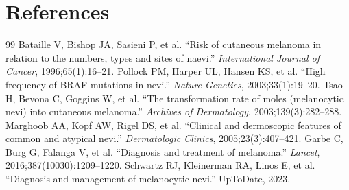 \section*{References}
\begin{thebibliography}{99}
 Bataille V, Bishop JA, Sasieni P, et al. ``Risk of cutaneous melanoma in relation to the numbers, types and sites of naevi.'' \textit{International Journal of Cancer}, 1996;65(1):16--21.
 Pollock PM, Harper UL, Hansen KS, et al. ``High frequency of BRAF mutations in nevi.'' \textit{Nature Genetics}, 2003;33(1):19--20.
 Tsao H, Bevona C, Goggins W, et al. ``The transformation rate of moles (melanocytic nevi) into cutaneous melanoma.'' \textit{Archives of Dermatology}, 2003;139(3):282--288.
 Marghoob AA, Kopf AW, Rigel DS, et al. ``Clinical and dermoscopic features of common and atypical nevi.'' \textit{Dermatologic Clinics}, 2005;23(3):407--421.
 Garbe C, Burg G, Falanga V, et al. ``Diagnosis and treatment of melanoma.'' \textit{Lancet}, 2016;387(10030):1209--1220.
 Schwartz RJ, Kleinerman RA, Linos E, et al. ``Diagnosis and management of melanocytic nevi.'' UpToDate, 2023.

\end{thebibliography}
